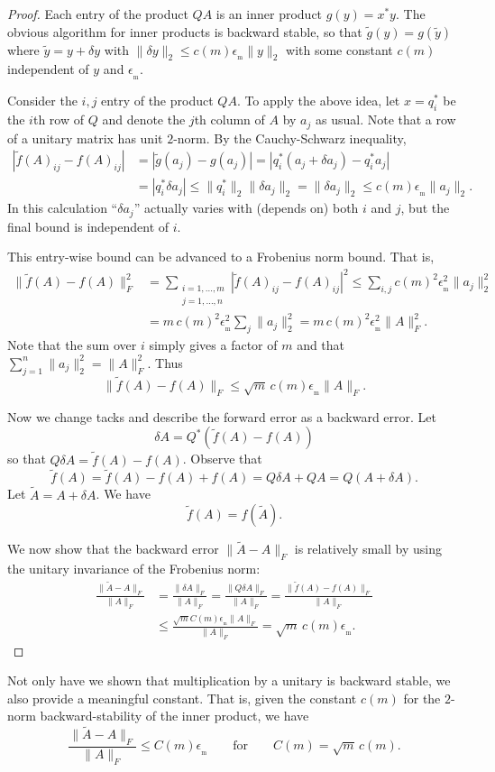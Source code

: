 \documentclass[12pt]{amsart}
\newcommand{\eps}{\epsilon}
\newcommand{\ema}{\emach}
\newcommand{\emach}{\eps_{\!_{\text{m}}}}
\begin{document}
\begin{proof}
Each entry of the product $QA$ is an inner product $g(y)=x^*y$.  The obvious algorithm for inner products is backward stable, so that $\tilde g(y) = g(\tilde y)$ where $\tilde y = y + \delta y$ with $\|\delta y\|_2 \le c(m) \ema \|y\|_2$ with some constant $c(m)$ independent of $y$ and $\ema$.

Consider the $i,j$ entry of the product $QA$.  To apply the above idea, let $x = q_i^*$ be the $i$th row of $Q$ and denote the $j$th column of $A$ by $a_j$ as usual.  Note that a row of a unitary matrix has unit $2$-norm.  By the Cauchy-Schwarz inequality,
\begin{align*}
|\tilde f(A)_{ij} - f(A)_{ij}| &= |\tilde g(a_j) - g(a_j)| = |q_i^* (a_j + \delta a_j) - q_i^* a_j|\\
  &= |q_i^* \delta a_j| \le \|q_i^*\|_2 \|\delta a_j\|_2 = \|\delta a_j\|_2 \le c(m) \ema \|a_j\|_2.
\end{align*}
In this calculation ``$\delta a_j$'' actually varies with (depends on) both $i$ and $j$, but the final bound is independent of $i$.

This entry-wise bound can be advanced to a Frobenius norm bound.  That is,
\begin{align*}
\|\tilde f(A) - f(A)\|_F^2 &= \sum_{\begin{smallmatrix} i=1,\dots,m \\ j=1,\dots,n \end{smallmatrix}}|\tilde f(A)_{ij} - f(A)_{ij}|^2 \le \sum_{i,j} c(m)^2 \ema^2 \|a_j\|_2^2 \\
   &= m\, c(m)^2 \ema^2 \sum_{j} \|a_j\|_2^2 = m\, c(m)^2 \ema^2 \|A\|_F^2.
\end{align*}
Note that the sum over $i$ simply gives a factor of $m$ and that $\sum_{j=1}^n \|a_j\|_2^2 = \|A\|_F^2$.  Thus
    $$\|\tilde f(A) - f(A)\|_F \le \sqrt{m}\, c(m) \ema \|A\|_F.$$

Now we change tacks and describe the forward error as a backward error.  Let
    $$\delta A = Q^*(\tilde f(A) - f(A))$$
so that $Q \delta A = \tilde f(A) - f(A)$.  Observe that
    $$\tilde f(A) = \tilde f(A) - f(A) + f(A) = Q \delta A + QA = Q (A+\delta A).$$
Let $\tilde A=A+\delta A$.  We have
    $$\tilde f(A) = f(\tilde A).$$

We now show that the backward error $\|\tilde A - A\|_F$ is relatively small by using the unitary invariance of the Frobenius norm:
\begin{align*}
\frac{\|\tilde A - A\|_F}{\|A\|_F} &= \frac{\|\delta A\|_F}{\|A\|_F} = \frac{\|Q\delta A\|_F}{\|A\|_F} = \frac{\|\tilde f(A) - f(A)\|_F}{\|A\|_F} \\
   &\le \frac{\sqrt{m} C(m) \ema \|A\|_F}{\|A\|_F} = \sqrt{m}\, c(m) \ema.
\end{align*}
\end{proof}

Not only have we shown that multiplication by a unitary is backward stable, we also provide a meaningful constant.  That is, given the constant $c(m)$ for the $2$-norm backward-stability of the inner product, we have
    $$\frac{\|\tilde A - A\|_F}{\|A\|_F} \le C(m) \ema  \qquad \text{for} \qquad C(m) = \sqrt{m}\, c(m).$$
\end{document}
